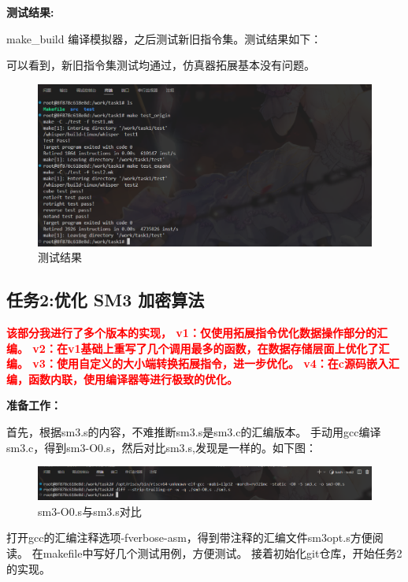 \documentclass[12pt,hyperref,a4paper,UTF8]{ctexart}
\begin{document}
\begin{itemize}
\end{itemize}

\textbf{测试结果:}

make\_build 编译模拟器，之后测试新旧指令集。测试结果如下：

可以看到，新旧指令集测试均通过，仿真器拓展基本没有问题。

  \begin{figure}[H]
      \centering
      \includegraphics[width =1.0\textwidth]{figures/fig/image8.png}
      \caption{测试结果}
  \end{figure}

\subsection{任务2:优化 SM3 加密算法}
\textcolor{red}{\textbf{该部分我进行了多个版本的实现，
v1：仅使用拓展指令优化数据操作部分的汇编。
v2：在v1基础上重写了几个调用最多的函数，在数据存储层面上优化了汇编。
v3：使用自定义的大小端转换拓展指令，进一步优化。
v4：在c源码嵌入汇编，函数内联，使用编译器等进行极致的优化。}}

\textbf{准备工作：}

首先，根据sm3.s的内容，不难推断sm3.s是sm3.c的汇编版本。
手动用gcc编译sm3.c，得到sm3-O0.s，然后对比sm3.s,发现是一样的。如下图：

  \begin{figure}[H]
      \centering
      \includegraphics[width =1.0\textwidth]{figures/fig/image9.png}
      \caption{sm3-O0.s与sm3.s对比}
  \end{figure}

  打开gcc的汇编注释选项-fverbose-asm，得到带注释的汇编文件sm3opt.s方便阅读。
  在makefile中写好几个测试用例，方便测试。
  接着初始化git仓库，开始任务2的实现。
\end{document}
